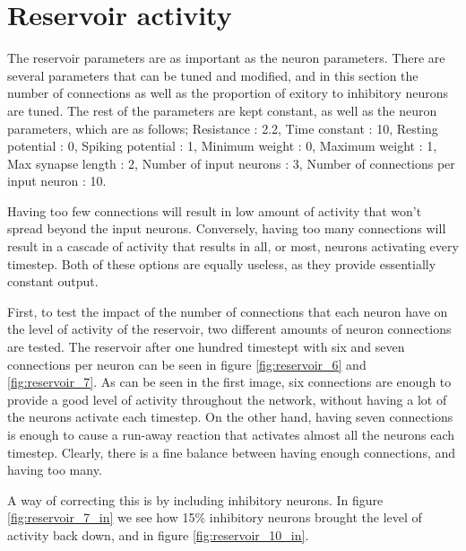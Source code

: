 \section{Reservoir activity}

The reservoir parameters are as important as the neuron parameters. There are several parameters that can be tuned and modified, and in this section the number of connections as well as the proportion of exitory to inhibitory neurons are tuned. The rest of the parameters are kept constant, as well as the neuron parameters, which are as follows; Resistance : 2.2, Time constant : 10, Resting potential : 0, Spiking potential : 1, Minimum weight : 0, Maximum weight : 1, Max synapse length : 2, Number of input neurons : 3, Number of connections per input neuron : 10.

 Having too few connections will result in low amount of activity that won't spread beyond the input neurons. Conversely, having too many connections will result in a cascade of activity that results in all, or most, neurons activating every timestep. Both of these options are equally useless, as they provide essentially constant output.

First, to test the impact of the number of connections that each neuron have on the level of activity of the reservoir, two different amounts of neuron connections are tested. The reservoir after one hundred timestept with six and seven connections per neuron can be seen in figure \ref{fig:reservoir_6} and \ref{fig:reservoir_7}. As can be seen in the first image, six connections are enough to provide a good level of activity throughout the network, without having a lot of the neurons activate each timestep. On the other hand, having seven connections is enough to cause a run-away reaction that activates almost all the neurons each timestep. Clearly, there is a fine balance between having enough connections, and having too many.

A way of correcting this is by including inhibitory neurons. In figure \ref{fig:reservoir_7_in} we see how 15\% inhibitory neurons brought the level of activity back down, and in figure \ref{fig:reservoir_10_in}.

